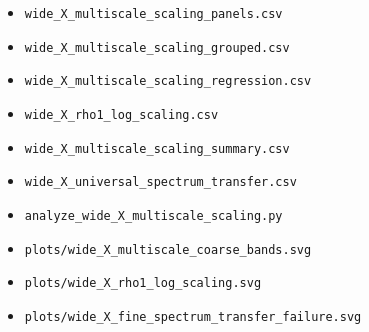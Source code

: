 \documentclass[12pt]{article}
\begin{document}
\begin{itemize}
\item \texttt{wide\_X\_multiscale\_scaling\_panels.csv}
\item \texttt{wide\_X\_multiscale\_scaling\_grouped.csv}
\item \texttt{wide\_X\_multiscale\_scaling\_regression.csv}
\item \texttt{wide\_X\_rho1\_log\_scaling.csv}
\item \texttt{wide\_X\_multiscale\_scaling\_summary.csv}
\item \texttt{wide\_X\_universal\_spectrum\_transfer.csv}
\item \texttt{analyze\_wide\_X\_multiscale\_scaling.py}
\item \texttt{plots/wide\_X\_multiscale\_coarse\_bands.svg}
\item \texttt{plots/wide\_X\_rho1\_log\_scaling.svg}
\item \texttt{plots/wide\_X\_fine\_spectrum\_transfer\_failure.svg}
\end{itemize}
\end{document}
